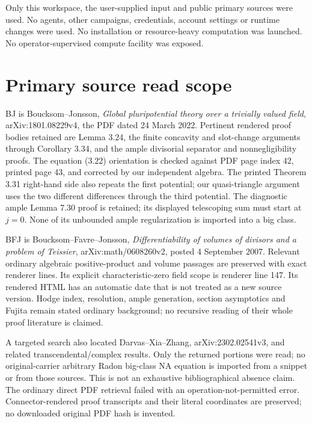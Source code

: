 \documentclass[10pt]{article}
\begin{document}
Only this workspace, the user-supplied input and public primary sources
were used. No agents, other campaigns, credentials, account settings or
runtime changes were used. No installation or resource-heavy computation
was launched. No operator-supervised compute facility was exposed.

\appendix
\section{Primary source read scope}
BJ is Boucksom--Jonsson, \emph{Global pluripotential theory over a
trivially valued field}, arXiv:1801.08229v4, the PDF dated
24 March 2022. Pertinent rendered proof bodies retained are
Lemma 3.24, the finite concavity and slot-change arguments through
Corollary 3.34, and the ample divisorial separator and nonnegligibility
proofs. The equation (3.22) orientation is checked against PDF page
index 42, printed page 43, and corrected by our independent algebra.
The printed Theorem 3.31 right-hand side also repeats the first
potential; our quasi-triangle argument uses the two different
differences through the third potential. The diagnostic ample
Lemma 7.30 proof is retained; its displayed telescoping sum must
start at $j=0$. None of its unbounded ample regularization is
imported into a big class.

BFJ is Boucksom--Favre--Jonsson, \emph{Differentiability of volumes of
divisors and a problem of Teissier}, arXiv:math/0608260v2,
posted 4 September 2007. Relevant ordinary algebraic positive-product
and volume passages are preserved with exact renderer lines.
Its explicit characteristic-zero field scope is renderer line 147.
Its rendered HTML has an automatic date that is not treated as a new
source version. Hodge index, resolution, ample generation, section
asymptotics and Fujita remain stated ordinary background; no recursive
reading of their whole proof literature is claimed.

A targeted search also located Darvas--Xia--Zhang,
arXiv:2302.02541v3, and related transcendental/complex results.
Only the returned portions were read; no original-carrier arbitrary
Radon big-class NA equation is imported from a snippet or from those
sources. This is not an exhaustive bibliographical absence claim.
The ordinary direct PDF retrieval failed with an operation-not-permitted
error. Connector-rendered proof transcripts and their literal coordinates
are preserved; no downloaded original PDF hash is invented.
\end{document}
